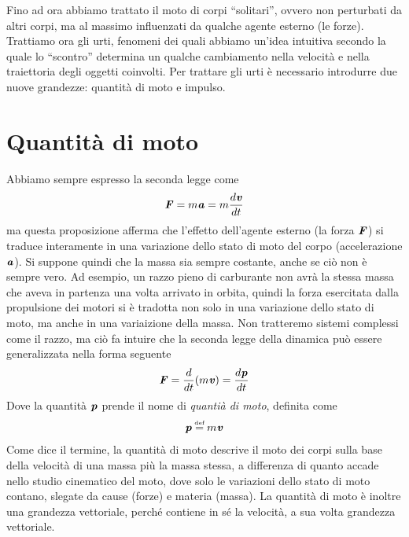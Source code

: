 \marginpar{\minitoc}

Fino ad ora abbiamo trattato il moto di corpi ``solitari'', ovvero non
perturbati da altri corpi, ma al massimo influenzati da qualche agente
esterno (le forze). Trattiamo ora gli urti, fenomeni dei quali abbiamo
un'idea intuitiva secondo la quale lo ``scontro'' determina un qualche
cambiamento nella velocità e nella traiettoria degli oggetti coinvolti.
Per trattare gli urti è necessario introdurre due nuove grandezze:
quantità di moto e impulso.

\vspace*{-0.5cm}
\section{Quantità di moto}
Abbiamo sempre espresso la seconda legge come
\[ \textbf{\textit{F}} = m\textbf{\textit{a}} = m\frac{d\textbf{\textit{v}}}{dt} \]
ma questa proposizione afferma che l'effetto dell'agente esterno (la forza
$\textbf{\textit{F}}$) si traduce interamente in una variazione dello stato di
moto del corpo (accelerazione $\textbf{\textit{a}}$). Si suppone quindi che la
massa sia sempre costante, anche se ciò non è sempre vero. Ad esempio,
un razzo pieno di carburante non avrà la stessa massa che aveva in partenza
una volta arrivato in orbita, quindi la forza esercitata dalla propulsione
dei motori si è tradotta non solo in una variazione dello stato di moto,
ma anche in una variaizione della massa. Non tratteremo sistemi complessi
come il razzo, ma ciò fa intuire che la seconda legge della dinamica può
essere generalizzata nella forma seguente
\begin{align}
    \textbf{\textit{F}} = \frac{d}{dt}(m\textbf{\textit{v}}) = \frac{d\textbf{\textit{p}}}{dt}\label{qtamotosecondalegge}
\end{align}
Dove la quantità $\textbf{\textit{p}}$ prende il nome di \textit{quantià di moto},
definita come
\begin{align}
    \vecsymb{p} \eqdef m\vecsymb{v}
\end{align}
Come dice il termine, la quantità di moto descrive il moto dei corpi
sulla base della velocità di una massa più la massa stessa, a differenza
di quanto accade nello studio cinematico del moto, dove solo le variazioni
dello stato di moto contano, slegate da cause (forze) e materia (massa).
La quantità di moto è inoltre una grandezza vettoriale, perché contiene
in sé la velocità, a sua volta grandezza vettoriale.



